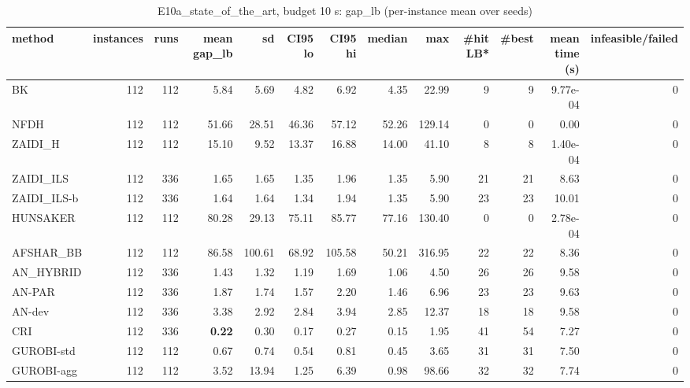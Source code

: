 \begin{table}[htbp]
\centering
\small
\caption{E10a\_state\_of\_the\_art, budget 10 s: gap\_lb (per-instance mean over seeds)}
\label{tab:E10a_state_of_the_art_b10_summary}
\begin{tabular}{lrrrrrrrrrrrr}
\toprule
method & instances & runs & mean gap\_lb & sd & CI95 lo & CI95 hi & median & max & \#hit LB* & \#best & mean time (s) & infeasible/failed \\
\midrule
BK & 112 & 112 & 5.84 & 5.69 & 4.82 & 6.92 & 4.35 & 22.99 & 9 & 9 & 9.77e-04 & 0 \\
NFDH & 112 & 112 & 51.66 & 28.51 & 46.36 & 57.12 & 52.26 & 129.14 & 0 & 0 & 0.00 & 0 \\
ZAIDI\_H & 112 & 112 & 15.10 & 9.52 & 13.37 & 16.88 & 14.00 & 41.10 & 8 & 8 & 1.40e-04 & 0 \\
ZAIDI\_ILS & 112 & 336 & 1.65 & 1.65 & 1.35 & 1.96 & 1.35 & 5.90 & 21 & 21 & 8.63 & 0 \\
ZAIDI\_ILS-b & 112 & 336 & 1.64 & 1.64 & 1.34 & 1.94 & 1.35 & 5.90 & 23 & 23 & 10.01 & 0 \\
HUNSAKER & 112 & 112 & 80.28 & 29.13 & 75.11 & 85.77 & 77.16 & 130.40 & 0 & 0 & 2.78e-04 & 0 \\
AFSHAR\_BB & 112 & 112 & 86.58 & 100.61 & 68.92 & 105.58 & 50.21 & 316.95 & 22 & 22 & 8.36 & 0 \\
AN\_HYBRID & 112 & 336 & 1.43 & 1.32 & 1.19 & 1.69 & 1.06 & 4.50 & 26 & 26 & 9.58 & 0 \\
AN-PAR & 112 & 336 & 1.87 & 1.74 & 1.57 & 2.20 & 1.46 & 6.96 & 23 & 23 & 9.63 & 0 \\
AN-dev & 112 & 336 & 3.38 & 2.92 & 2.84 & 3.94 & 2.85 & 12.37 & 18 & 18 & 9.58 & 0 \\
CRI & 112 & 336 & \textbf{0.22} & 0.30 & 0.17 & 0.27 & 0.15 & 1.95 & 41 & 54 & 7.27 & 0 \\
GUROBI-std & 112 & 112 & 0.67 & 0.74 & 0.54 & 0.81 & 0.45 & 3.65 & 31 & 31 & 7.50 & 0 \\
GUROBI-agg & 112 & 112 & 3.52 & 13.94 & 1.25 & 6.39 & 0.98 & 98.66 & 32 & 32 & 7.74 & 0 \\
\bottomrule
\end{tabular}
\end{table}
